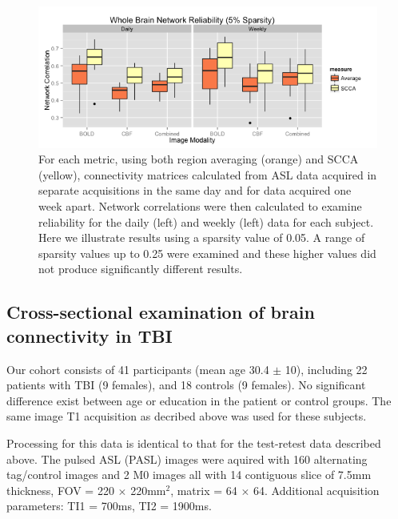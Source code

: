 \documentclass{llncs}
\begin{document}
\begin{figure}[tb]
\begin{center}
\includegraphics[width=0.75\linewidth]{retest.png} 
\caption{For each metric, using both region averaging (orange) and SCCA (yellow), connectivity matrices calculated from ASL data acquired in separate acquisitions in the same day and for data acquired one week apart. Network correlations were then calculated to examine reliability for the daily (left) and weekly (left) data for each subject. Here we illustrate results using a sparsity value of 0.05. A range of sparsity values up to 0.25 were examined and these higher values did not produce significantly different results.}
\label{fig:testretest}
\end{center}
\end{figure}

\subsection{Cross-sectional examination of brain connectivity in TBI}
 Our cohort consists of 41 participants (mean age 30.4 $\pm$ 10), including 22 patients with TBI (9 females), and 18 controls (9 females). No significant difference exist between age or education in the patient or control groups.  The same image T1 acquisition as decribed above was used for these subjects.

 Processing for this data is identical to that for the test-retest data described above. The pulsed ASL (PASL) images were aquired with 160 alternating tag/control images and 2 M0 images all with 14 contiguous slice of 7.5mm thickness, FOV = 220 $\times$ 220mm$^2$, matrix = 64 $\times$ 64. Additional acquisition parameters: TI1 = 700ms, TI2 = 1900ms.
\end{document}
